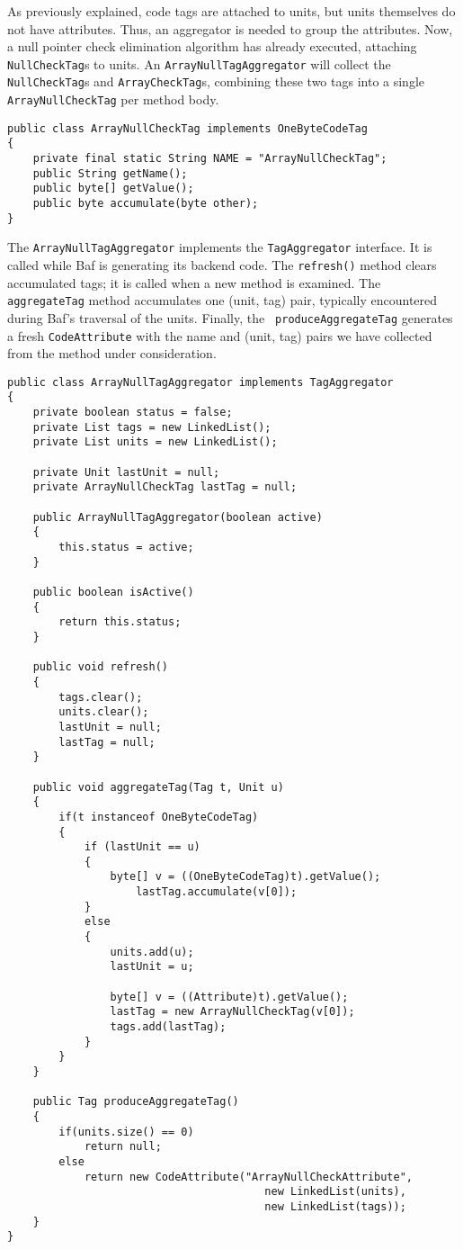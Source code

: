 \documentclass{article}
\begin{document}
As previously explained, code tags are attached to units, but units
themselves do not have attributes. Thus, an aggregator
is needed to group the attributes. Now, a null pointer check
elimination algorithm has already executed, attaching {\tt NullCheckTag}s to
units. An {\tt ArrayNullTagAggregator} will collect the {\tt NullCheckTag}s
and {\tt ArrayCheckTag}s, combining these two tags into 
a single {\tt ArrayNullCheckTag} per method body.

\begin{verbatim}
public class ArrayNullCheckTag implements OneByteCodeTag
{
    private final static String NAME = "ArrayNullCheckTag";
    public String getName();
    public byte[] getValue();
    public byte accumulate(byte other);
}
\end{verbatim}

The {\tt ArrayNullTagAggregator} implements the {\tt TagAggregator}
interface.  It is called while Baf is generating its backend code.
The {\tt refresh()} method clears accumulated tags; it
is called when a new method is examined.  The {\tt aggregateTag}
method accumulates one (unit, tag) pair, typically encountered
during Baf's traversal of the units.  Finally, the {\tt
produceAggregateTag} generates a fresh {\tt CodeAttribute} with the name and
(unit, tag) pairs we have collected from the method under consideration.

\begin{verbatim}
public class ArrayNullTagAggregator implements TagAggregator
{    
    private boolean status = false;
    private List tags = new LinkedList();
    private List units = new LinkedList();

    private Unit lastUnit = null;
    private ArrayNullCheckTag lastTag = null;
    
    public ArrayNullTagAggregator(boolean active)
    {
        this.status = active;
    }
    
    public boolean isActive()
    {
        return this.status;
    }

    public void refresh()
    {
        tags.clear();
        units.clear();
        lastUnit = null;
        lastTag = null;
    }

    public void aggregateTag(Tag t, Unit u)
    {
        if(t instanceof OneByteCodeTag) 
        {        
            if (lastUnit == u)
            {
                byte[] v = ((OneByteCodeTag)t).getValue();
                    lastTag.accumulate(v[0]);
            }
            else
            {
                units.add(u);
                lastUnit = u;
                
                byte[] v = ((Attribute)t).getValue();
                lastTag = new ArrayNullCheckTag(v[0]);
                tags.add(lastTag);
            }
        }
    }
    
    public Tag produceAggregateTag()
    {
        if(units.size() == 0)
            return null;
        else
            return new CodeAttribute("ArrayNullCheckAttribute", 
                                        new LinkedList(units), 
                                        new LinkedList(tags));
    }
}
\end{verbatim}
\end{document}
